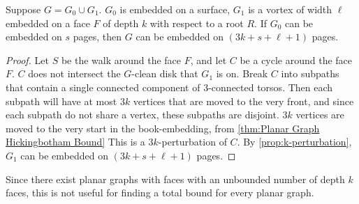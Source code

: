 \begin{proposition}
	Suppose $G = G_0 \cup G_1$. $G_0$ is embedded on a surface, $G_1$ is a vortex of width $\ell$ embedded on a face $F$ of depth $k$ with respect to a root $R$. If $G_0$ can be embedded on $s$ pages, then $G$ can be embedded on $(3k + s + \ell + 1)$ pages.
\end{proposition}

\begin{proof}
	Let $S$ be the walk around the face $F$, and let $C$ be a cycle around the face $F$. $C$ does not intersect the $G$-clean disk that $G_1$ is on. Break $C$ into subpaths that contain a single connected component of $3$-connected torsos. Then each subpath will have at most $3k$ vertices that are moved to the very front, and since each subpath do not share a vertex, these subpaths are disjoint. $3k$ vertices are moved to the very start in the book-embedding, from \cref{thm:Planar Graph Hickingbotham Bound} This is a $3k$-perturbation of $C$. By \cref{prop:k-perturbation}, $G_1$ can be embedded on $(3k + s + \ell + 1)$ pages. 
\end{proof}

Since there exist planar graphs with faces with an unbounded number of depth $k$ faces, this is not useful for finding a total bound for every planar graph. 